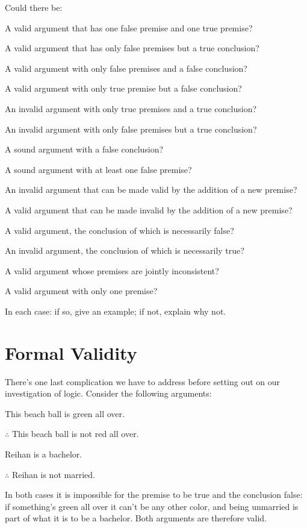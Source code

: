 \problempart
Could there be:
	\begin{earg}
		\item A valid argument that has one false premise and one true premise?
		\item A valid argument that has only false premises but a true conclusion?
		\item A valid argument with only false premises and a false conclusion?
		\item A valid argument with only true premise but a false conclusion?
		\item An invalid argument with only true premises and a true conclusion?
		\item An invalid argument with only false premises but a true conclusion?
		\item A sound argument with a false conclusion?
		\item A sound argument with at least one false premise?
		\item An invalid argument that can be made valid by the addition of a new premise?
		\item A valid argument that can be made invalid by the addition of a new premise?
		\item A valid argument, the conclusion of which is necessarily false?
		\item An invalid argument, the conclusion of which is necessarily true?
		\item A valid argument whose premises are jointly inconsistent?
		\item A valid argument with only one premise?
	\end{earg}
In each case: if so, give an example; if not, explain why not. 




\section{Formal Validity}\label{s:FormalValidity}

There's one last complication we have to address before setting out on our investigation of logic.  Consider the following arguments:

	\begin{earg}
		\item[\ex{exarg5}] This beach ball is green all over.
		\item[] $\therefore$ This beach ball is not red all over. 
	\end{earg}
	
	\begin{earg}
		\item[\ex{exarg6}]  Reihan is a bachelor.
		\item[] $\therefore$ Reihan is not married.
	\end{earg}	
In both cases it is impossible for the premise to be true and the conclusion false: if something's green all over it can't be any other color, and being unmarried is part of what it is to be a bachelor.  Both arguments are therefore valid. 

